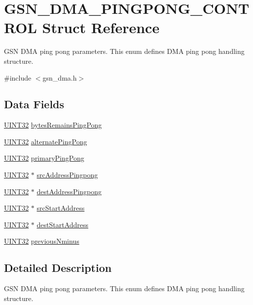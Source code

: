 \hypertarget{a00051}{
\section{GSN\_\-DMA\_\-PINGPONG\_\-CONTROL Struct Reference}
\label{a00051}
}


GSN DMA ping pong parameters. This enum defines DMA ping pong handling structure.  




{\ttfamily \#include $<$gsn\_\-dma.h$>$}

\subsection*{Data Fields}
\begin{DoxyCompactItemize}
\item 
\hyperlink{a00660_gae1e6edbbc26d6fbc71a90190d0266018}{UINT32} \hyperlink{a00051_a9394c38b85c47383e3bb7eed9d98a83f}{bytesRemainsPingPong}
\item 
\hyperlink{a00660_gae1e6edbbc26d6fbc71a90190d0266018}{UINT32} \hyperlink{a00051_ab281cce68bb01d3d53c7abb348d990fb}{alternatePingPong}
\item 
\hyperlink{a00660_gae1e6edbbc26d6fbc71a90190d0266018}{UINT32} \hyperlink{a00051_ad4078bc8cf6f9d0b3af0438e195a96cc}{primaryPingPong}
\item 
\hyperlink{a00660_gae1e6edbbc26d6fbc71a90190d0266018}{UINT32} $\ast$ \hyperlink{a00051_ae75c2d97f44150875a3be3d8b863d3cd}{srcAddressPingpong}
\item 
\hyperlink{a00660_gae1e6edbbc26d6fbc71a90190d0266018}{UINT32} $\ast$ \hyperlink{a00051_a45a1fc7c409bf6980b896df19fc9770f}{destAddressPingpong}
\item 
\hyperlink{a00660_gae1e6edbbc26d6fbc71a90190d0266018}{UINT32} $\ast$ \hyperlink{a00051_a52e21e4c98a2c8c53e8894906c522c2b}{srcStartAddress}
\item 
\hyperlink{a00660_gae1e6edbbc26d6fbc71a90190d0266018}{UINT32} $\ast$ \hyperlink{a00051_a3c64b1ed1990e2323788cffdf4683f8e}{destStartAddress}
\item 
\hyperlink{a00660_gae1e6edbbc26d6fbc71a90190d0266018}{UINT32} \hyperlink{a00051_ae498e8892e4e01c12202554b703f92f9}{previousNminus}
\end{DoxyCompactItemize}


\subsection{Detailed Description}
GSN DMA ping pong parameters. This enum defines DMA ping pong handling structure. 

